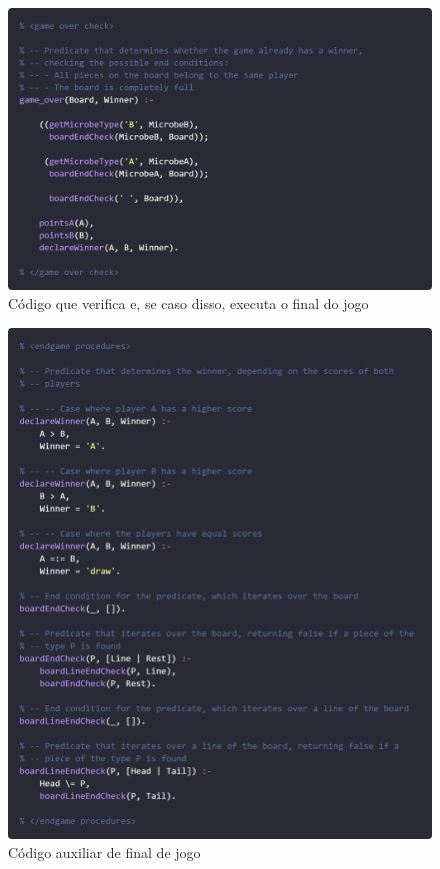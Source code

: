 \documentclass[a4paper]{article}
\begin{document}
\bigskip
\begin{figure}[hbp!]
    \centering
    \includegraphics[width=\linewidth]{prints/game-over.png}
    \caption{Código que verifica e, se caso disso, executa o final do jogo}
    \label{fig}
\end{figure}

\begin{figure}[hbp!]
    \centering
    \includegraphics[width=\linewidth]{prints/game-over-check.png}
    \caption{Código auxiliar de final de jogo}
    \label{fig}
\end{figure}
\end{document}
